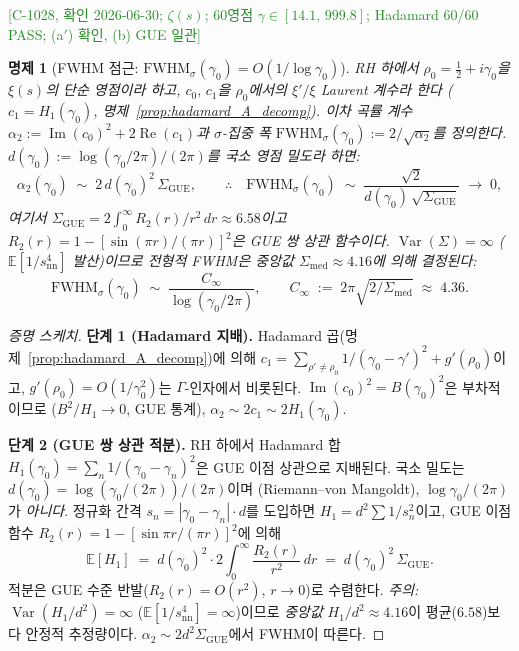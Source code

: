 \documentclass[11pt, a4paper]{article}
\theoremstyle{definition}
\theoremstyle{plain}
\newtheorem{proposition}[theorem]{명제}
\begin{document}
\textcolor{ForestGreen}{[C-1028, 확인 2026-06-30; $\zeta(s)$;
60영점 $\gamma \in [14.1,\,999.8]$;
Hadamard 60/60 PASS; (a$'$) 확인, (b) GUE 일관]}

\begin{proposition}[FWHM 점근: $\mathrm{FWHM}_\sigma(\gamma_0) = O(1/\!\log\gamma_0)$]
\label{prop:fwhm_asymptotic}
RH 하에서 $\rho_0 = \tfrac{1}{2} + i\gamma_0$을 $\xi(s)$의 단순 영점이라 하고,
$c_0,\,c_1$을 $\rho_0$에서의 $\xi'/\xi$ Laurent 계수라 한다
($c_1 = H_1(\gamma_0)$, 명제~\ref{prop:hadamard_A_decomp}).
이차 곡률 계수 $\alpha_2 := \operatorname{Im}(c_0)^2 + 2\operatorname{Re}(c_1)$과
$\sigma$-집중 폭 $\mathrm{FWHM}_\sigma(\gamma_0) := 2/\!\sqrt{\alpha_2}$를 정의한다.
$d(\gamma_0) := \log(\gamma_0/2\pi)/(2\pi)$를 국소 영점 밀도라 하면:
\[
  \alpha_2(\gamma_0) \;\sim\; 2\,d(\gamma_0)^2\, \Sigma_{\mathrm{GUE}},
  \qquad\therefore\quad
  \mathrm{FWHM}_\sigma(\gamma_0) \;\sim\; \frac{\sqrt{2}}{d(\gamma_0)\,\sqrt{\Sigma_{\mathrm{GUE}}}}
  \;\to\; 0,
\]
여기서 $\Sigma_{\mathrm{GUE}} = 2\int_0^\infty R_2(r)/r^2\,dr \approx 6.58$이고
$R_2(r) = 1 - [\sin(\pi r)/(\pi r)]^2$은 GUE 쌍 상관 함수이다.
$\operatorname{Var}(\Sigma) = \infty$ ($\mathbb{E}[1/s_{\mathrm{nn}}^4]$ 발산)이므로
\emph{전형적} FWHM은 중앙값 $\Sigma_{\mathrm{med}} \approx 4.16$에 의해 결정된다:
\[
  \mathrm{FWHM}_\sigma(\gamma_0)
  \;\sim\; \frac{C_\infty}{\log(\gamma_0/2\pi)},
  \qquad
  C_\infty \;:=\; 2\pi\sqrt{2/\Sigma_{\mathrm{med}}} \;\approx\; 4.36.
\]
\end{proposition}

\begin{proof}[증명 스케치]
\textbf{단계 1 (Hadamard 지배).}
Hadamard 곱(명제~\ref{prop:hadamard_A_decomp})에 의해
$c_1 = \sum_{\rho'\neq\rho_0} 1/(\gamma_0 - \gamma')^2 + g'(\rho_0)$이고,
$g'(\rho_0) = O(1/\gamma_0^2)$는 $\Gamma$-인자에서 비롯된다.
$\operatorname{Im}(c_0)^2 = B(\gamma_0)^2$은 부차적이므로
($B^2/H_1 \to 0$, GUE 통계),
$\alpha_2 \sim 2c_1 \sim 2H_1(\gamma_0)$.

\textbf{단계 2 (GUE 쌍 상관 적분).}
RH 하에서 Hadamard 합 $H_1(\gamma_0) = \sum_n 1/(\gamma_0-\gamma_n)^2$은
GUE 이점 상관으로 지배된다.
국소 밀도는 $d(\gamma_0) = \log(\gamma_0/(2\pi))/(2\pi)$이며
(Riemann--von Mangoldt), $\log\gamma_0/(2\pi)$가 \emph{아니다}.
정규화 간격 $s_n = |\gamma_0 - \gamma_n| \cdot d$를 도입하면
$H_1 = d^2 \sum 1/s_n^2$이고,
GUE 이점 함수 $R_2(r) = 1 - [\sin\pi r/(\pi r)]^2$에 의해
\[
  \mathbb{E}[H_1] \;=\; d(\gamma_0)^2 \cdot 2\!\int_0^\infty
  \frac{R_2(r)}{r^2}\,dr
  \;=\; d(\gamma_0)^2 \,\Sigma_{\mathrm{GUE}}.
\]
적분은 GUE 수준 반발($R_2(r) = O(r^2)$, $r \to 0$)로 수렴한다.
\emph{주의:} $\operatorname{Var}(H_1/d^2) = \infty$
($\mathbb{E}[1/s_{\mathrm{nn}}^4] = \infty$)이므로
\emph{중앙값} $H_1/d^2 \approx 4.16$이 평균($6.58$)보다 안정적 추정량이다.
$\alpha_2 \sim 2d^2 \Sigma_{\mathrm{GUE}}$에서 FWHM이 따른다.
\end{proof}
\end{document}
